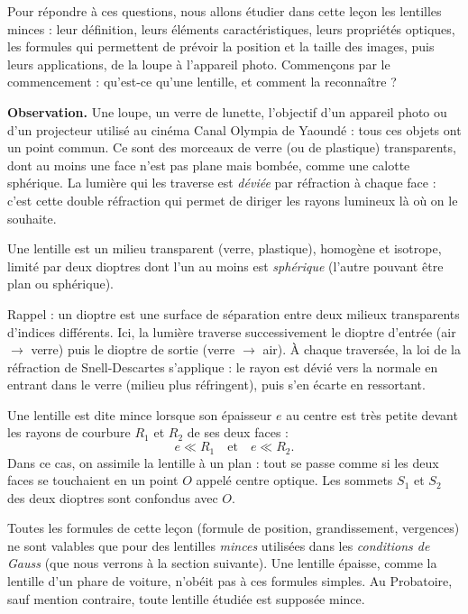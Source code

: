 \documentclass[11pt]{article}
\newcommand{\cle}[1]{{\popxbold\color{popdark}#1}}
\newcounter{popsec}
\newcounter{popsub}
\newcommand{\courssub}[1]{%
  \stepcounter{popsub}%
  \par\vspace{9pt}\noindent{\popxbold\fontsize{11.5}{13}\selectfont\color{popink}{\color{poporange}\thepopsec.\thepopsub}\hspace{6pt}#1}\par\nopagebreak\vspace{4pt}
}
\begin{document}
Pour répondre à ces questions, nous allons étudier dans cette leçon les \cle{lentilles minces} : leur définition, leurs éléments caractéristiques, leurs propriétés optiques, les formules qui permettent de prévoir la position et la taille des images, puis leurs applications, de la loupe à l'appareil photo. Commençons par le commencement : qu'est-ce qu'une lentille, et comment la reconnaître ?

\courssub{Définition d'une lentille mince}

\textbf{Observation.} Une loupe, un verre de lunette, l'objectif d'un appareil photo ou d'un projecteur utilisé au cinéma Canal Olympia de Yaoundé : tous ces objets ont un point commun. Ce sont des morceaux de verre (ou de plastique) transparents, dont au moins une face n'est pas plane mais bombée, comme une calotte sphérique. La lumière qui les traverse est \emph{déviée} par réfraction à chaque face : c'est cette double réfraction qui permet de diriger les rayons lumineux là où on le souhaite.

\begin{definition}[Lentille]
Une \cle{lentille} est un milieu transparent (verre, plastique), homogène et isotrope, limité par deux \cle{dioptres} dont l'un au moins est \emph{sphérique} (l'autre pouvant être plan ou sphérique).
\end{definition}

Rappel : un \cle{dioptre} est une surface de séparation entre deux milieux transparents d'indices différents. Ici, la lumière traverse successivement le dioptre d'entrée (air $\to$ verre) puis le dioptre de sortie (verre $\to$ air). À chaque traversée, la loi de la réfraction de Snell-Descartes s'applique : le rayon est dévié vers la normale en entrant dans le verre (milieu plus réfringent), puis s'en écarte en ressortant.

\begin{definition}
Une lentille est dite \cle{mince} lorsque son épaisseur $e$ au centre est très petite devant les rayons de courbure $R_1$ et $R_2$ de ses deux faces :
\[ e \ll R_1 \quad \text{et} \quad e \ll R_2. \]
Dans ce cas, on assimile la lentille à un plan : tout se passe comme si les deux faces se touchaient en un point $O$ appelé \cle{centre optique}. Les sommets $S_1$ et $S_2$ des deux dioptres sont confondus avec $O$.
\end{definition}

\begin{attention}
Toutes les formules de cette leçon (formule de position, grandissement, vergences) ne sont valables que pour des lentilles \emph{minces} utilisées dans les \emph{conditions de Gauss} (que nous verrons à la section suivante). Une lentille épaisse, comme la lentille d'un phare de voiture, n'obéit pas à ces formules simples. Au Probatoire, sauf mention contraire, toute lentille étudiée est supposée mince.
\end{attention}
\end{document}
